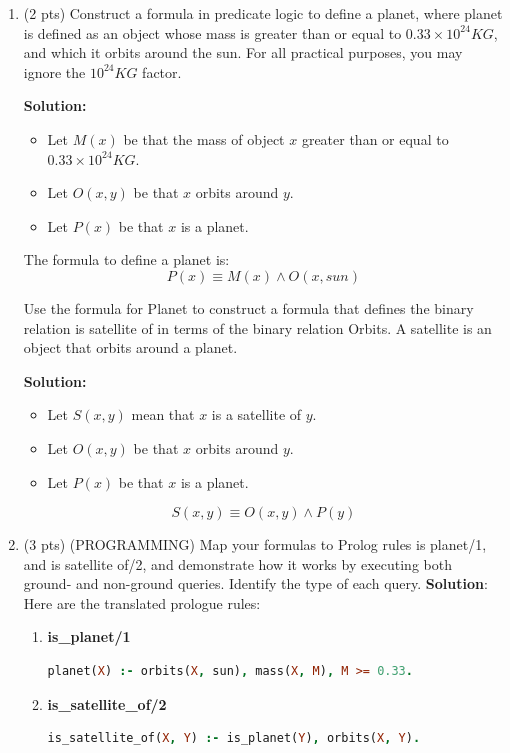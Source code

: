 \documentclass[12pt]{article}
\begin{document}
	\begin{enumerate}
		\item  (2 pts) Construct a formula in predicate logic to define a planet, where planet is defined
		as an object whose mass is greater than or equal to $0.33 \times 10^{24}KG$, and which it orbits around the sun. For all practical purposes, you may ignore the $10^{24}KG$ factor.

		\textbf{Solution:}
		\begin{itemize}
			\item Let $M(x)$ be that the mass of object $x$ greater than or equal to $0.33 \times 10^{24}KG$.
			\item Let $O(x, y)$ be that $x$ orbits around $y$.
			\item Let $P(x)$ be that $x$ is a planet.
		\end{itemize}

		The formula to define a planet is: $$P(x) \equiv M(x) \land O(x, sun)$$

		Use the formula for Planet to construct a formula that defines the binary relation
		is satellite of in terms of the binary relation Orbits. A satellite is an object that
		orbits around a planet.
		
		\textbf{Solution:}
		\begin{itemize}
			\item Let $S(x, y)$ mean that $x$ is a satellite of $y$.
			\item Let $O(x, y)$ be that $x$ orbits around $y$.
			\item Let $P(x)$ be that $x$ is a planet.
		\end{itemize}
		$$S(x, y) \equiv O(x, y) \land P(y) $$

		\pagebreak

		\item (3 pts) (PROGRAMMING) Map your formulas to Prolog rules is planet/1, and is satellite of/2, and demonstrate how it works by executing both ground- and non-ground queries. Identify the type of each query.
		\textbf{Solution}:
		Here are the translated prologue rules:
		\begin{enumerate}
			\item \textbf{is\_planet/1}
			\begin{lstlisting}[language=Prolog]
planet(X) :- orbits(X, sun), mass(X, M), M >= 0.33.
			\end{lstlisting}
			\item \textbf{is\_satellite\_of/2}
			\begin{lstlisting}[language=Prolog]
is_satellite_of(X, Y) :- is_planet(Y), orbits(X, Y).		
			\end{lstlisting}
		\end{enumerate}


\end{enumerate}
\end{document}
